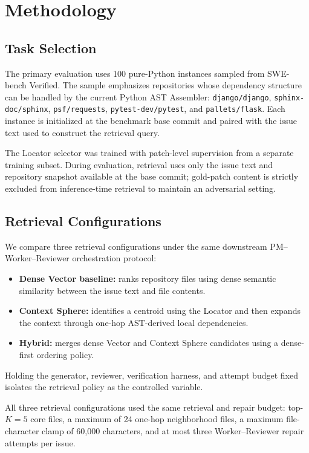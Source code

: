 \section{Methodology}

\subsection{Task Selection}

The primary evaluation uses 100 pure-Python instances sampled from SWE-bench Verified. The sample emphasizes repositories whose dependency structure can be handled by the current Python AST Assembler: \texttt{django/django}, \texttt{sphinx-doc/sphinx}, \texttt{psf/requests}, \texttt{pytest-dev/pytest}, and \texttt{pallets/flask}. Each instance is initialized at the benchmark base commit and paired with the issue text used to construct the retrieval query.

The Locator selector was trained with patch-level supervision from a separate training subset. During evaluation, retrieval uses only the issue text and repository snapshot available at the base commit; gold-patch content is strictly excluded from inference-time retrieval to maintain an adversarial setting.

\subsection{Retrieval Configurations}

We compare three retrieval configurations under the same downstream PM--Worker--Reviewer orchestration protocol:
\begin{itemize}
    \item \textbf{Dense Vector baseline:} ranks repository files using dense semantic similarity between the issue text and file contents.
    \item \textbf{Context Sphere:} identifies a centroid using the Locator and then expands the context through one-hop AST-derived local dependencies.
    \item \textbf{Hybrid:} merges dense Vector and Context Sphere candidates using a dense-first ordering policy.
\end{itemize}
Holding the generator, reviewer, verification harness, and attempt budget fixed isolates the retrieval policy as the controlled variable.

All three retrieval configurations used the same retrieval and repair budget: top-\(K=5\) core files, a maximum of 24 one-hop neighborhood files, a maximum file-character clamp of 60{,}000 characters, and at most three Worker--Reviewer repair attempts per issue.

